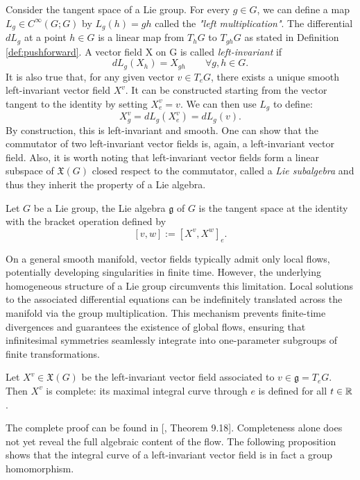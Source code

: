 Consider the tangent space of a Lie group. For every $g \in G$, we can define a map $L_g \in C^\infty(G;G)$ by $L_g(h) = gh$ called the \textit{"left multiplication"}. The differential $dL_g$ at a point $h \in G$ is a linear map from $T_hG$ to $T_{gh}G$ as stated in Definition \ref{def:pushforward}. A vector field X on G is called \textit{left-invariant} if
\[
	dL_g (X_h) = X_{gh} \qquad \forall g,h \in G.
\]
It is also true that, for any given vector $v \in T_eG$, there exists a unique smooth left-invariant vector field $X^v$. It can be constructed starting from the vector tangent to the identity by setting $X^v_e = v$. We can then use $L_g$ to define:
\[
	X^v_g = dL_g (X^v_e) = dL_g(v).
\]
By construction, this is left-invariant and smooth.
One can show that the commutator of two left-invariant vector fields is, again, a left-invariant vector field. Also, it is worth noting that left-invariant vector fields form a linear subspace of $\mathfrak{X}(G)$ closed respect to the commutator, called a \textit{Lie subalgebra} and thus they inherit the property of a Lie algebra. 

\begin{definition}\label{def:lie-gralg}
	Let $G$ be a Lie group, the Lie algebra $\mathfrak{g}$ of $G$ is the tangent space at the identity with the bracket operation defined by
	\[
		[v, w] := [X^v, X^w]_e.
	\] 
\end{definition}

\noindent On a general smooth manifold, vector fields typically admit only local flows, potentially developing singularities in finite time. However, the underlying homogeneous structure of a Lie group circumvents this limitation. Local solutions to the associated differential equations can be indefinitely translated across the manifold via the group multiplication. This mechanism prevents finite-time divergences and guarantees the existence of global flows, ensuring that infinitesimal symmetries seamlessly integrate into one-parameter subgroups of finite transformations. 

\begin{proposition}\label{prop:complete}
	Let $X^v \in \mathfrak{X}(G)$ be the left-invariant vector field associated to $v \in \mathfrak{g} = T_eG$. Then $X^v$ is complete: its maximal integral curve through $e$ is defined for all $t \in \mathbb{R}$.
\end{proposition}

The complete proof can be found in [\cite{leeIntroductionSmoothManifolds2013}, Theorem 9.18]. Completeness alone does not yet reveal the full algebraic content of the flow. The following proposition shows that the integral curve of a left-invariant vector field is in fact a group homomorphism.

